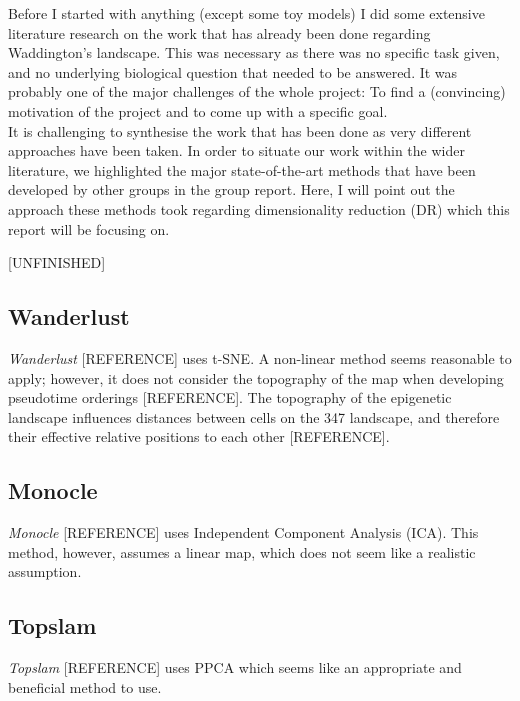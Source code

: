 \documentclass[journal, a4paper]{IEEEtran}
\begin{document}
Before I started with anything (except some toy models) I did some extensive literature research on the work that has already been done regarding Waddington's landscape. This was necessary as there was no specific task given, and no underlying biological question that needed to be answered. It was probably one of the major challenges of the whole project: To find a (convincing) motivation of the project and to come up with a specific goal.\\
It is challenging to synthesise the work that has been done as very different approaches have been taken. In order to situate our work within the wider literature, we highlighted the major state-of-the-art methods that have been developed by other groups in the group report.
Here, I will point out the approach these methods took regarding dimensionality reduction (DR) which this report will be focusing on. 

[UNFINISHED]

\subsection{Wanderlust}
\textit{Wanderlust} [REFERENCE] uses t-SNE. A non-linear method seems reasonable to apply; however, it does not consider the topography of the map when developing pseudotime orderings [REFERENCE]. The topography of the epigenetic landscape influences distances between cells on the 347 landscape, and therefore their effective relative positions to each other [REFERENCE]. 

\subsection{Monocle}
\textit{Monocle} [REFERENCE] uses Independent Component Analysis (ICA). This method, however, assumes a linear map, which does not seem like a realistic assumption.

\subsection{Topslam}
\textit{Topslam} [REFERENCE] uses PPCA which seems like an appropriate and beneficial method to use.
\end{document}
